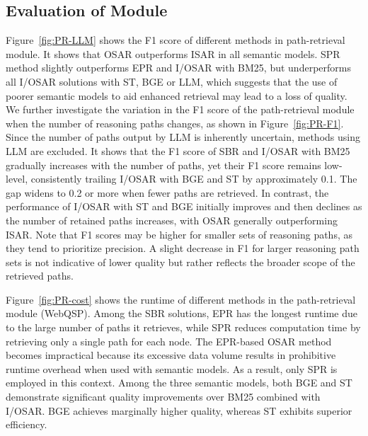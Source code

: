 

\subsection{Evaluation of {\Retrieval} Module}
\label{exp:Retrieval}


Figure~\ref{fig:PR-LLM} shows the F1 score of different methods in path-retrieval module.
   It shows that OSAR outperforms ISAR in all semantic models. SPR method slightly outperforms EPR and I/OSAR with BM25, but underperforms all I/OSAR solutions with ST, BGE or LLM, which suggests that the use of poorer semantic models to aid enhanced retrieval may lead to a loss of quality.
We further investigate the variation in the F1 score of the path-retrieval module when the number of reasoning paths changes, as shown in Figure~\ref{fig:PR-F1}. Since the number of paths output by LLM is inherently uncertain, methods using LLM are excluded.
It shows that the F1 score of SBR and I/OSAR with BM25 gradually increases with the number of paths, yet their F1 score remains low-level, consistently trailing I/OSAR with BGE and ST by approximately 0.1. The gap widens to 0.2 or more when fewer paths are retrieved. In contrast, the performance of I/OSAR with ST and BGE initially improves and then declines as the number of retained paths increases, with OSAR generally outperforming ISAR. Note that F1 scores may be higher for smaller sets of reasoning paths, as they tend to prioritize precision. A slight decrease in F1 for larger reasoning path sets is not indicative of lower quality but rather reflects the broader scope of the retrieved paths.



Figure~\ref{fig:PR-cost} shows the runtime of different methods in the path-retrieval module (WebQSP). Among the SBR solutions, EPR has the longest runtime due to the large number of paths it retrieves, while SPR reduces computation time by retrieving only a single path for each node. 
The EPR-based OSAR method becomes impractical because its excessive data volume results in prohibitive runtime overhead when used with semantic models. As a result, only SPR is employed in this context.
Among the three semantic models, both BGE and ST demonstrate significant quality improvements over BM25 combined with I/OSAR. BGE achieves marginally higher quality, whereas ST exhibits superior efficiency. 

